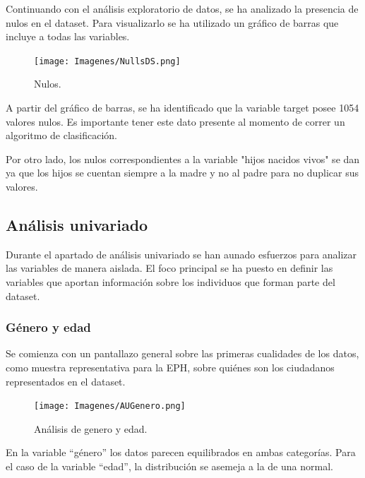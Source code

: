 \documentclass[a4paper]{article}
\begin{document}
    \newpage

    Continuando con el análisis exploratorio de datos, se ha analizado la presencia de nulos en el dataset. Para visualizarlo se ha utilizado un gráfico de barras que incluye a todas las variables. 
   
    \begin{figure}[H]
        \centering
        \texttt{[image: Imagenes/NullsDS.png]}
        \caption{Nulos.}
        \label{nulls}
    \end{figure}
 
    A partir del gráfico de barras, se ha identificado que la variable target posee 1054 valores nulos. Es importante tener este dato presente al momento de correr un algoritmo de clasificación.

    Por otro lado, los nulos correspondientes a la variable "hijos nacidos vivos" se dan ya que los hijos se cuentan siempre a la madre y no al padre para no duplicar sus valores.

    \subsection{Análisis univariado}

    Durante el apartado de análisis univariado se han aunado esfuerzos para analizar las variables de manera aislada. El foco principal se ha puesto en definir las variables que aportan información sobre los individuos que forman parte del dataset.
        \subsubsection{Género y edad}
           
            Se comienza con un pantallazo general sobre las primeras cualidades de los datos, como muestra representativa para la EPH, sobre quiénes son los ciudadanos representados en el dataset.
           
            \begin{figure}[H]
                \centering
                \texttt{[image: Imagenes/AUGenero.png]}
                \caption{Análisis de genero y edad.}
                \label{AU genre and age}
            \end{figure}
            
            En la variable ``género'' los datos parecen equilibrados en ambas categorías. Para el caso de la variable ``edad'', la distribución se asemeja a la de una normal.
           
\end{document}
